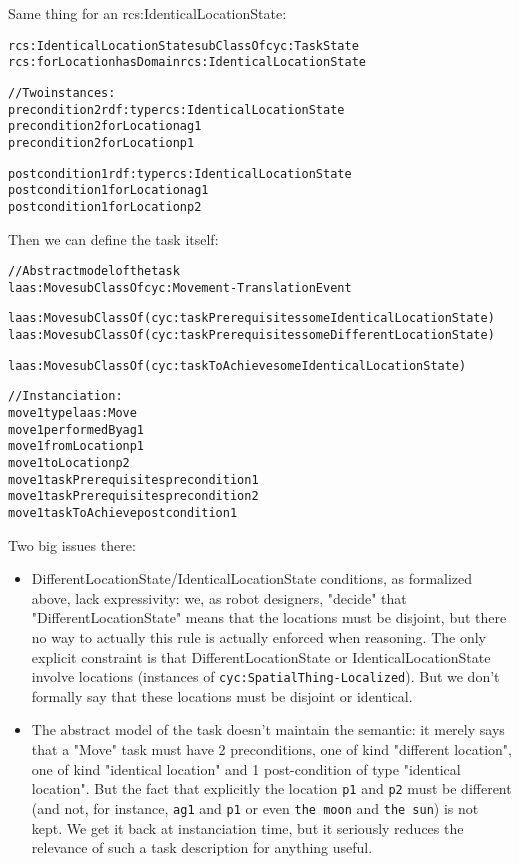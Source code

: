 Same thing for an rcs:IdenticalLocationState:



\begin{alltt}

rcs:IdenticalLocationState subClassOf cyc:TaskState
rcs:forLocation hasDomain rcs:IdenticalLocationState

//Two instances:
precondition2 rdf:type rcs:IdenticalLocationState
precondition2 forLocation ag1
precondition2 forLocation p1

postcondition1 rdf:type rcs:IdenticalLocationState
postcondition1 forLocation ag1
postcondition1 forLocation p2

\end{alltt}

Then we can define the task itself:



\begin{alltt}

//Abstract model of the task
laas:Move subClassOf cyc:Movement-TranslationEvent

laas:Move subClassOf (cyc:taskPrerequisites some IdenticalLocationState)
laas:Move subClassOf (cyc:taskPrerequisites some DifferentLocationState)

laas:Move subClassOf (cyc:taskToAchieve some IdenticalLocationState)

//Instanciation:
move1 type laas:Move
move1 performedBy ag1
move1 fromLocation p1
move1 toLocation p2
move1 taskPrerequisites precondition1
move1 taskPrerequisites precondition2
move1 taskToAchieve postcondition1

\end{alltt}

Two big issues there:


\begin{itemize}

\item  DifferentLocationState/IdenticalLocationState conditions, as formalized
above, lack expressivity: we, as robot designers, "decide" that
"DifferentLocationState" means that the locations must be disjoint, but there
no way to actually this rule is actually enforced when reasoning. The only
explicit constraint is that DifferentLocationState or IdenticalLocationState
involve locations (instances of {\tt cyc:SpatialThing-Localized}). But we don't
formally say that these locations must be disjoint or identical.

\item  The abstract model of the task doesn't maintain the semantic: it merely
says that a "Move" task must have 2 preconditions, one of kind "different
location", one of kind "identical location" and 1 post-condition of type
"identical location". But the fact that explicitly the location {\tt p1} and
{\tt p2} must be different (and not, for instance, {\tt ag1} and {\tt p1} or
even {\tt the moon} and {\tt the sun}) is not kept. We get it back at
instanciation time, but it seriously reduces the relevance of such a task
description for anything useful.

\end{itemize}


